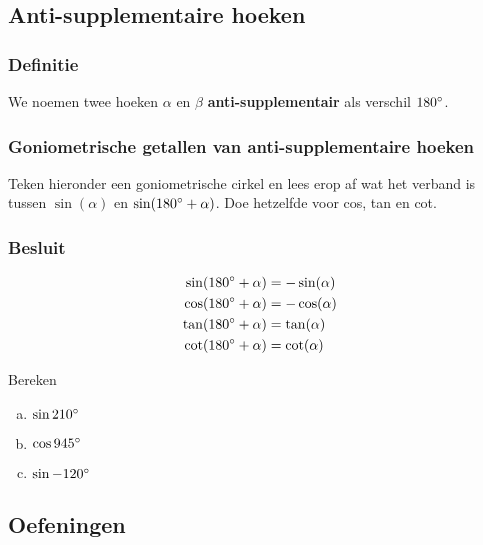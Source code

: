 \documentclass[a4paper,12pt]{article}
\begin{document}
\begin{theorie}

\pagebreak
\subsection{Anti-supplementaire hoeken}

\subsubsection*{Definitie}
We noemen twee hoeken $\alpha$ en $\beta$ \textbf{anti-supplementair} als verschil $180^\circ$.

\subsubsection*{Goniometrische getallen van anti-supplementaire hoeken}
Teken hieronder een goniometrische cirkel en lees erop af wat het verband is tussen $\sin(\alpha)$ en $\sin(180^\circ+\alpha)$. Doe hetzelfde voor cos, tan en cot.
\vspace*{6cm}

\subsubsection*{Besluit}
\begin{align*}
\sin(180^\circ+\alpha)&=-\sin(\alpha)\\
\cos(180^\circ+\alpha)&=-\cos(\alpha)\\
\tan(180^\circ+\alpha)&=\tan(\alpha)\\
\cot(180^\circ+\alpha)&=\cot(\alpha)
\end{align*}

\end{theorie}

\begin{oefening}
Bereken
\begin{enumerate}[(a)]
  \item $\sin210^\circ$
  \item $\cos945^\circ$
  \item $\sin-120^\circ$
\end{enumerate}
\end{oefening}

\begin{theorie}

\pagebreak
\subsection{Oefeningen}

\end{theorie}
\end{document}
